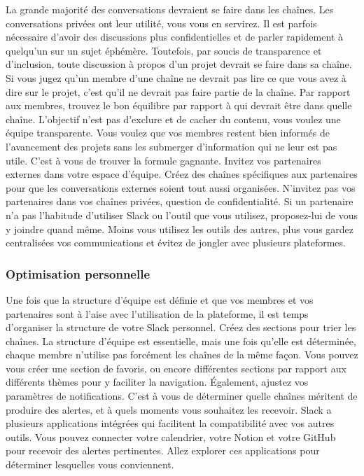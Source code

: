 \documentclass[
  letterpaper,
]{scrbook}
\begin{document}
La grande majorité des conversations devraient se faire dans les
chaînes. Les conversations privées ont leur utilité, vous vous en
servirez. Il est parfois nécessaire d'avoir des discussions plus
confidentielles et de parler rapidement à quelqu'un sur un sujet
éphémère. Toutefois, par soucis de transparence et d'inclusion, toute
discussion à propos d'un projet devrait se faire dans sa chaîne. Si vous
jugez qu'un membre d'une chaîne ne devrait pas lire ce que vous avez à
dire sur le projet, c'est qu'il ne devrait pas faire partie de la
chaîne. Par rapport aux membres, trouvez le bon équilibre par rapport à
qui devrait être dans quelle chaîne. L'objectif n'est pas d'exclure et
de cacher du contenu, vous voulez une équipe transparente. Vous voulez
que vos membres restent bien informés de l'avancement des projets sans
les submerger d'information qui ne leur est pas utile. C'est à vous de
trouver la formule gagnante. Invitez vos partenaires externes dans votre
espace d'équipe. Créez des chaînes spécifiques aux partenaires pour que
les conversations externes soient tout aussi organisées. N'invitez pas
vos partenaires dans vos chaînes privées, question de confidentialité.
Si un partenaire n'a pas l'habitude d'utiliser Slack ou l'outil que vous
utilisez, proposez-lui de vous y joindre quand même. Moins vous utilisez
les outils des autres, plus vous gardez centralisées vos communications
et évitez de jongler avec plusieurs plateformes.

\hypertarget{optimisation-personnelle}{%
\subsubsection{Optimisation
personnelle}\label{optimisation-personnelle}}

Une fois que la structure d'équipe est définie et que vos membres et vos
partenaires sont à l'aise avec l'utilisation de la plateforme, il est
temps d'organiser la structure de votre Slack personnel. Créez des
sections pour trier les chaînes. La structure d'équipe est essentielle,
mais une fois qu'elle est déterminée, chaque membre n'utilise pas
forcément les chaînes de la même façon. Vous pouvez vous créer une
section de favoris, ou encore différentes sections par rapport aux
différents thèmes pour y faciliter la navigation. Également, ajustez vos
paramètres de notifications. C'est à vous de déterminer quelle chaînes
méritent de produire des alertes, et à quels moments vous souhaitez les
recevoir. Slack a plusieurs applications intégrées qui facilitent la
compatibilité avec vos autres outils. Vous pouvez connecter votre
calendrier, votre Notion et votre GitHub pour recevoir des alertes
pertinentes. Allez explorer ces applications pour déterminer lesquelles
vous conviennent.
\end{document}
